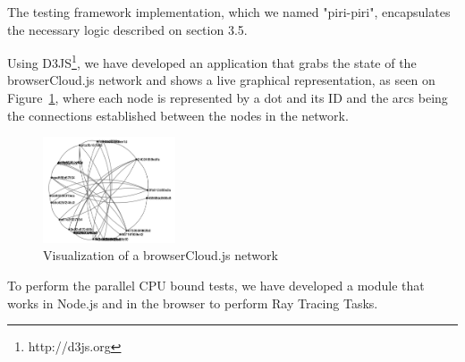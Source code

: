 The testing framework implementation, which we named "piri-piri", encapsulates the necessary logic described on section 3.5.


Using D3JS\footnote{http://d3js.org}, we have developed an application that grabs the state of the browserCloud.js network and shows a live graphical representation, as seen on Figure~\ref{fig:visualizer}, where each node is represented by a dot and its ID and the arcs being the connections established between the nodes in the network. 

\begin{figure}[h!]
  \centering
  \includegraphics[width=0.35\textwidth]{figs/visualizer}
  \caption{Visualization of a browserCloud.js network}
  \label{fig:visualizer}
\end{figure}


To perform the parallel CPU bound tests, we have developed a module that works in Node.js and in the browser to perform Ray Tracing Tasks.
